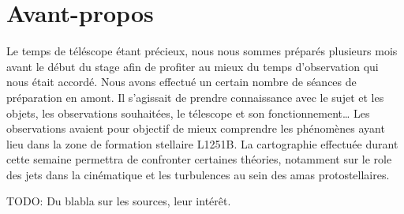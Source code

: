 \documentclass[a4paper,10pt,french]{article}
\begin{document}
\tableofcontents

\newpage


\setlength{\parindent}{16pt}
\setlength{\parskip}{1ex}


\section{Avant-propos}

Le temps de téléscope étant précieux, nous nous sommes préparés plusieurs mois avant le début du 
stage afin de profiter au mieux du temps d’observation qui nous était accordé.
Nous avons effectué un certain nombre de séances de préparation en amont. Il
s’agissait de prendre connaissance avec le sujet et les objets, les
observations souhaitées, le télescope et son fonctionnement…
Les observations avaient pour objectif de mieux comprendre les phénomènes ayant lieu dans la zone de formation stellaire L1251B.
La cartographie effectuée durant cette semaine permettra de confronter certaines théories, notamment sur le role des jets dans la cinématique et les turbulences au sein des amas protostellaires.

TODO: Du blabla sur les sources, leur intérêt.
\end{document}
